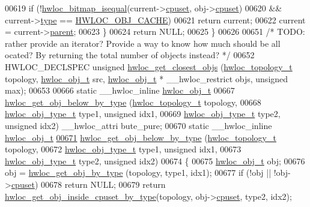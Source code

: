\begin{DoxyCode}
00619     \textcolor{keywordflow}{if} (!\hyperlink{a00065_ga4dd6a75ab63d33ef33bd626b0e489388}{hwloc_bitmap_isequal}(current->\hyperlink{a00016_a67925e0f2c47f50408fbdb9bddd0790f}{cpuset}, obj->\hyperlink{a00016_a67925e0f2c47f50408fbdb9bddd0790f}{cpuset})
00620         && current->\hyperlink{a00016_acc4f0803f244867e68fe0036800be5de}{type} == \hyperlink{a00041_ggacd37bb612667dc437d66bfb175a8dc55a56ee0b7eca88f363b75b34fdde8c9ddc}{HWLOC_OBJ_CACHE})
00621       \textcolor{keywordflow}{return} current;
00622     current = current->\hyperlink{a00016_adc494f6aed939992be1c55cca5822900}{parent};
00623   \}
00624   \textcolor{keywordflow}{return} NULL;
00625 \}
00626 
00651 \textcolor{comment}{/* TODO: rather provide an iterator? Provide a way to know how much should be all
      ocated? By returning the total number of objects instead? */}
00652 HWLOC\_DECLSPEC \textcolor{keywordtype}{unsigned} \hyperlink{a00058_ga26c2ac4f25b1ed293249c88e232f1bea}{hwloc_get_closest_objs} (\hyperlink{a00039_ga9d1e76ee15a7dee158b786c30b6a6e38}{hwloc_topology_t} topology, 
      \hyperlink{a00016}{hwloc_obj_t} src, \hyperlink{a00016}{hwloc_obj_t} * \_\_hwloc\_restrict objs, \textcolor{keywordtype}{unsigned} max);
00653 
00666 \textcolor{keyword}{static} \_\_hwloc\_inline \hyperlink{a00016}{hwloc_obj_t}
00667 \hyperlink{a00058_ga6c482c2097f01b1ff88598fec8a1ba3b}{hwloc_get_obj_below_by_type} (\hyperlink{a00039_ga9d1e76ee15a7dee158b786c30b6a6e38}{hwloc_topology_t} topology,
00668                              \hyperlink{a00041_gacd37bb612667dc437d66bfb175a8dc55}{hwloc_obj_type_t} type1, \textcolor{keywordtype}{unsigned} idx1,
00669                              \hyperlink{a00041_gacd37bb612667dc437d66bfb175a8dc55}{hwloc_obj_type_t} type2, \textcolor{keywordtype}{unsigned} idx2) \_\_hwloc\_attri
      bute\_pure;
00670 \textcolor{keyword}{static} \_\_hwloc\_inline \hyperlink{a00016}{hwloc_obj_t}
\hypertarget{a00031_source_l00671}{}\hyperlink{a00058_ga6c482c2097f01b1ff88598fec8a1ba3b}{00671} \hyperlink{a00058_ga6c482c2097f01b1ff88598fec8a1ba3b}{hwloc_get_obj_below_by_type} (\hyperlink{a00039_ga9d1e76ee15a7dee158b786c30b6a6e38}{hwloc_topology_t} topology,
00672                              \hyperlink{a00041_gacd37bb612667dc437d66bfb175a8dc55}{hwloc_obj_type_t} type1, \textcolor{keywordtype}{unsigned} idx1,
00673                              \hyperlink{a00041_gacd37bb612667dc437d66bfb175a8dc55}{hwloc_obj_type_t} type2, \textcolor{keywordtype}{unsigned} idx2)
00674 \{
00675   \hyperlink{a00016}{hwloc_obj_t} obj;
00676   obj = \hyperlink{a00047_ga9be4a03488cdd0fb431e4aa1cbdea895}{hwloc_get_obj_by_type} (topology, type1, idx1);
00677   \textcolor{keywordflow}{if} (!obj || !obj->\hyperlink{a00016_a67925e0f2c47f50408fbdb9bddd0790f}{cpuset})
00678     \textcolor{keywordflow}{return} NULL;
00679   \textcolor{keywordflow}{return} \hyperlink{a00054_gaa8dcdb85224f7350b90fb0a1ca91e6d6}{hwloc_get_obj_inside_cpuset_by_type}(topology, obj->\hyperlink{a00016_a67925e0f2c47f50408fbdb9bddd0790f}{cpuset}, type2, idx2);
      

\end{DoxyCode}
